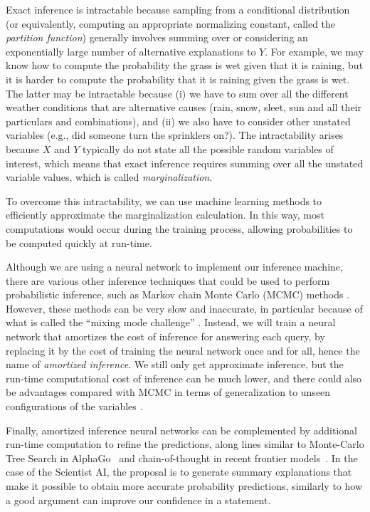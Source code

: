 Exact inference is intractable because sampling from a conditional distribution (or equivalently, computing an appropriate normalizing constant, called the \emph{partition function}) generally involves summing over or considering an exponentially large number of alternative explanations to $Y$. For example, we may know how to compute the probability the grass is wet given that it is raining, but it is harder to compute the probability that it is raining given the grass is wet. The latter may be intractable because (i) we have to sum over all the different weather conditions that are alternative causes (rain, snow, sleet, sun and all their particulars and combinations), and (ii) we also have to consider other unstated variables (e.g., did someone turn the sprinklers on?). The intractability arises because $X$ and $Y$ typically do not state all the possible random variables of interest, which means that exact inference requires summing over all the unstated variable values, which is called \textit{marginalization}.

To overcome this intractability, we can use machine learning methods to efficiently approximate the marginalization calculation. In this way, most computations would occur during the training process, allowing probabilities to be computed quickly at run-time. 

Although we are using a neural network to implement our inference machine, there are various other inference techniques that could be used to perform probabilistic inference, such as Markov chain Monte Carlo (MCMC) methods \cite{link.springer.com.book.10.1007.978.1.4612.1276.8}. However, these methods can be very slow and inaccurate, in particular because of what is called the ``mixing mode challenge'' \cite{proceedings.mlr.press.v28.bengio13.html, proceedings.neurips.cc.paper.2021.hash.e614f646836aaed9f89ce58e837e2310.Abstract.html}. Instead, we will train a neural network that amortizes the cost of inference for answering each query, by replacing it by the cost of training the neural network once and for all, hence the name of \textit{amortized inference}. We still only get approximate inference, but the run-time computational cost of inference can be much lower, and there could also be advantages compared with MCMC in terms of generalization to unseen configurations of the variables \cite{proceedings.mlr.press.v162.zhang22v.html}.

Finally, amortized inference neural networks can be complemented by additional run-time computation to refine the predictions, along lines similar to Monte-Carlo Tree Search in AlphaGo~\cite{www.nature.com.articles.nature16961} and chain-of-thought in recent frontier models~\cite{openai.com.index.learning.to.reason.with.llms}. In the case of the Scientist AI, the proposal is to generate summary explanations that make it possible to obtain more accurate probability predictions, similarly to how a good argument can improve our confidence in a statement. 

